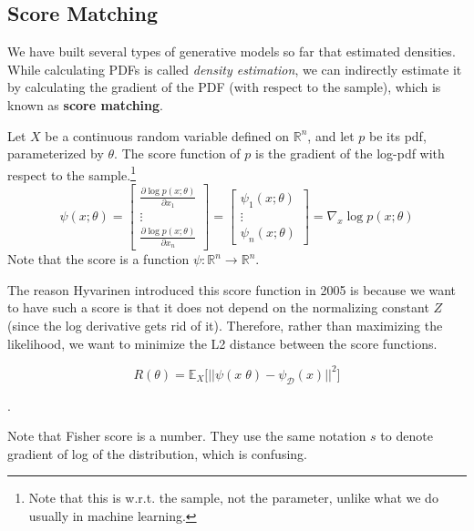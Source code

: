 \subsection{Score Matching}

  We have built several types of generative models so far that estimated densities. While calculating PDFs is called \textit{density estimation}, we can indirectly estimate it by calculating the gradient of the PDF (with respect to the sample), which is known as \textbf{score matching}. 

  \begin{definition}[Score]
    Let $X$ be a continuous random variable defined on $\mathbb{R}^n$, and let $p$ be its pdf, parameterized by $\theta$. The score function of $p$ is the gradient of the log-pdf with respect to the sample.\footnote{Note that this is w.r.t. the sample, not the parameter, unlike what we do usually in machine learning.}
    \begin{equation}
      \psi (x; \theta) = \begin{bmatrix} \frac{\partial \log{p(x;\theta)}}{\partial x_1} \\ \vdots \\ \frac{\partial \log{p(x;\theta)}}{\partial x_n} \end{bmatrix} =  
      \begin{bmatrix}
        \psi_1 (x;\theta) \\ \vdots \\ \psi_n (x;\theta)
      \end{bmatrix} = 
      \nabla_x \log{p (x; \theta)}
    \end{equation}
    Note that the score is a function $\psi: \mathbb{R}^n \rightarrow \mathbb{R}^n$. 
  \end{definition} 

  The reason Hyvarinen introduced this score function in 2005 is because we want to have such a score is that it does not depend on the normalizing constant $Z$ (since the log derivative gets rid of it). \cite{orig_score} Therefore, rather than maximizing the likelihood, we want to minimize the L2 distance between the score functions. 

  \begin{equation}
    R(\theta) = \mathbb{E}_{X} \big[ || \psi(x\;\theta) - \psi_{\mathcal{D}} (x) ||^2 \big]
  \end{equation}

  \cite{score}. 

  Note that Fisher score is a number. They use the same notation $s$ to denote gradient of log of the distribution, which is confusing. 

